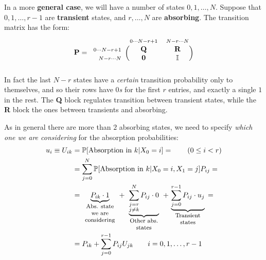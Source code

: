 \documentclass[../template.tex]{subfiles}
\begin{document}
\medskip

In a more \textbf{general case}, we will have a number of states $0, 1, \dots, N$. Suppose that $0,1,\dots, r-1$ are \textbf{transient} states, and $r,\dots,N$ are \textbf{absorbing}. The transition matrix has the form:
\begin{align}\label{eqn:P-7}
    \textbf{P} = \begin{blockarray}{l*{2}{c}}
        \begin{block}{l*{2}{>{\scriptstyle}c<{}}}
            & 0\cdots N-r+1 & N-r\cdots N \\
        \end{block}
        \begin{block}{>{\scriptstyle}r<{}(*{2}{c})}
            0\cdots N-r+1 & \textbf{Q}  & \textbf{R} \\
            N-r\cdots N & \textbf{0}   & \mathbb{I}\\
        \end{block}
    \end{blockarray}
\end{align}
In fact the last $N-r$ states have a \textit{certain} transition probability only to themselves, and so their rows have $0$\textit{s} for the first $r$ entries, and exactly a single $1$ in the rest. The \textbf{Q} block regulates transition between transient states, while the \textbf{R} block the ones between transients and absorbing.  

\medskip

As in general there are more than $2$ absorbing states, we need to specify \textit{which one we are considering} for the absorption probabilities:
\begin{align*}
    u_i \equiv U_{ik} &= \mathbb{P}[\text{Absorption in $k$}|X_0 = i] = \qquad (0\leq i < r)\\
    &= \sum_{j=0}^N \mathbb{P}[\text{Absorption in $k$}|X_0=i, X_1 = j]P_{ij} =\\
    &= \underbrace{P_{ik}\cdot 1 }_{\parbox{5em}{\footnotesize \centering Abs. state we are considering}}+ \underbrace{\sum_{\substack{j = r\\j \neq k}}^N P_{ij} \cdot 0 }_{\parbox{5em}{\footnotesize\centering Other abs. states}}+ \underbrace{\sum_{j=0}^{r-1} P_{ij} \cdot u_j}_{\parbox{5em}{\centering\footnotesize Transient states}} =\\
    &= P_{ik} + \sum_{j=0}^{r-1} P_{ij} U_{jk} \qquad i=0,1,\dots, r-1
\end{align*} 
\end{document}

